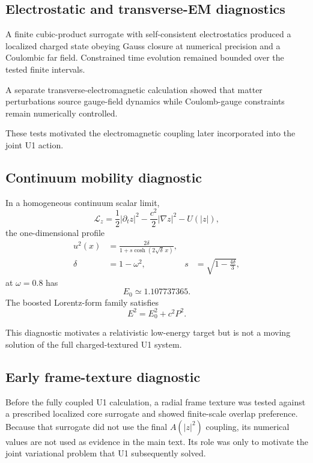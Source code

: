 \documentclass[11pt]{article}
\begin{document}
\subsection{Electrostatic and transverse-EM diagnostics}

A finite cubic-product surrogate with self-consistent electrostatics produced a localized charged state obeying Gauss closure at numerical precision and a Coulombic far field. Constrained time evolution remained bounded over the tested finite intervals.

A separate transverse-electromagnetic calculation showed that matter perturbations source gauge-field dynamics while Coulomb-gauge constraints remain numerically controlled.

These tests motivated the electromagnetic coupling later incorporated into the joint U1 action.

\subsection{Continuum mobility diagnostic}

In a homogeneous continuum scalar limit,
\begin{equation}
\mathcal L_z
=
\frac12|\partial_t z|^2
-
\frac{c^2}{2}|\nabla z|^2
-
U(|z|),
\end{equation}
the one-dimensional profile
\begin{equation}
\begin{aligned}
u^2(x)
&=
\frac{2\delta}
{1+s\cosh(2\sqrt{\delta}\,x)},
\\
\delta&=1-\omega^2,
&s&=\sqrt{1-\frac{4\delta}{3}},
\end{aligned}
\end{equation}
at \(\omega=0.8\) has
\begin{equation}
E_0\simeq1.107737365.
\end{equation}
The boosted Lorentz-form family satisfies
\begin{equation}
E^2=E_0^2+c^2P^2.
\end{equation}

This diagnostic motivates a relativistic low-energy target but is not a moving solution of the full charged-textured U1 system.

\subsection{Early frame-texture diagnostic}

Before the fully coupled U1 calculation, a radial frame texture was tested against a prescribed localized core surrogate and showed finite-scale overlap preference. Because that surrogate did not use the final \(A(|z|^2)\) coupling, its numerical values are not used as evidence in the main text. Its role was only to motivate the joint variational problem that U1 subsequently solved.
\end{document}
